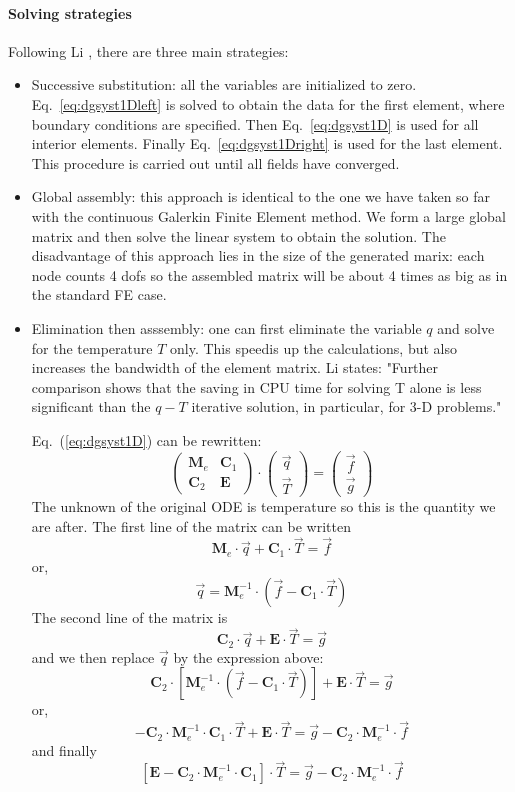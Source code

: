 \paragraph{Solving strategies} Following Li \cite{li06}, there are three main strategies:
\begin{itemize}
\item Successive substitution: all the variables are initialized to zero. 
Eq.~\eqref{eq:dgsyst1Dleft} is solved
to obtain the data for the first element, where boundary conditions are specified.
Then Eq.~\eqref{eq:dgsyst1D} is used for all interior elements.
Finally Eq.~\eqref{eq:dgsyst1Dright} is used for the last element.
This procedure is carried out until all fields have converged.  

\item Global assembly: this approach is identical to the one 
we have taken so far with the continuous Galerkin Finite Element method. 
We form a large global matrix and then solve the linear system 
to obtain the solution. The disadvantage of this approach lies in the size 
of the generated marix: each node counts 4 dofs so the assembled matrix 
will be about 4 times as big as in the standard FE case. 

\item Elimination then asssembly: one can first eliminate the variable $q$
and solve for the temperature $T$ only. This speedis up the
calculations, but also increases the bandwidth of the element matrix. Li \cite{li06}
states: "Further comparison shows that the saving in CPU time for solving T alone is less
significant than the $q-T$ iterative solution, in particular, for 3-D problems."


Eq.~(\ref{eq:dgsyst1D}) can be rewritten:
\begin{equation}
\left(
\begin{array}{cc}
{\bm M}_e & {\bm C}_1 \\
{\bm C}_2 & {\bm E} 
\end{array}
\right)
\cdot
\left(
\begin{array}{c}
\vec{q} \\ \vec{T} 
\end{array}
\right)
=
\left(
\begin{array}{c}
\vec{f} \\ \vec{g} 
\end{array}
\right)
\end{equation}
The unknown of the original ODE is temperature so this is the quantity we are after. 
The first line of the matrix can be written 
\[
 {\bm M}_e \cdot \vec{q}+ {\bm C}_1 \cdot \vec{T} = \vec{f} 
\]
or,
\[
\vec{q} =   {\bm M}_e^{-1} \cdot (\vec{f} -{\bm C}_1 \cdot \vec{T} )
\]
The second line of the matrix is 
\[
{\bm C}_2 \cdot \vec{q} + {\bm E} \cdot \vec{T} =  \vec{g}
\]
and we then replace $\vec{q}$ by the expression above:
\[
{\bm C}_2 \cdot [ {\bm M}_e^{-1}\cdot (\vec{f} -{\bm C}_1\cdot  \vec{T} ) ]
 + {\bm E}\cdot \vec{T} =  \vec{g}
\]
or, 
\[
- {\bm C}_2\cdot {\bm M}_e^{-1}\cdot {\bm C}_1 \cdot \vec{T}  
 + {\bm E}\cdot \vec{T} 
=  \vec{g} - {\bm C}_2\cdot  {\bm M}_e^{-1}\cdot \vec{f}
\]
and finally
\[
[ {\bm E} -  {\bm C}_2 \cdot {\bm M}_e^{-1} \cdot {\bm C}_1 ]\cdot  \vec{T}
=  \vec{g} - {\bm C}_2 \cdot {\bm M}_e^{-1} \cdot \vec{f}
\]
\end{itemize}
